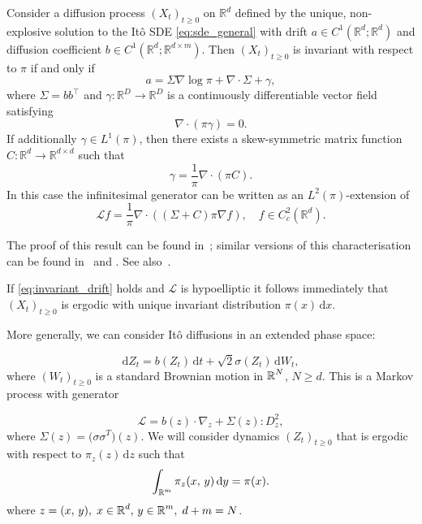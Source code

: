 \begin{theorem}
\label{theorem:invariance_theorem}
Consider a diffusion process $(X_t)_{t\ge0}$ on $\mathbb{R}^{d}$ defined by the unique, non-explosive solution to the It\^{o} SDE \eqref{eq:sde_general} with drift $a \in C^1(\mathbb{R}^{d}; \mathbb{R}^d)$ and  diffusion coefficient $b\in C^1(\mathbb{R}^d; \mathbb{R}^{d\times m})$.  Then $(X_t)_{t\ge0}$ is invariant with respect to ${\pi}$ if and only if  
\begin{equation}
\label{eq:invariant_drift}
a = \Sigma \nabla \log \pi + \nabla\cdot \Sigma + \gamma,
\end{equation} 
where $\Sigma = bb^\top$ and $\gamma: \mathbb{R}^D\rightarrow \mathbb{R}^D$  is a continuously differentiable vector field satisfying 
\begin{equation}
\label{eq:invariance_condition}
\nabla\cdot\left(\pi \gamma \right) = 0.
\end{equation}  
If additionally $\gamma \in L^1({\pi})$, then there exists a skew-symmetric matrix function $C:\mathbb{R}^d \rightarrow \mathbb{R}^{d\times d}$ such that
$$
  \gamma = \frac{1}{{\pi}} \nabla\cdot\left({\pi} C \right).
$$
In this case the infinitesimal generator can be written as an $L^2(\pi)$-extension of
$$
\mathcal{L}f = \frac{1}{{\pi}}\nabla\cdot\left((\Sigma + C){\pi}\nabla f\right),\quad f\in C^2_c(\mathbb{R}^d).
$$ 
\end{theorem}

The proof of this result can be found in~\cite[Ch. 4]{pavliotis2014stochastic}; similar versions of this characterisation can be found in~\cite{villani2009hypocoercivity} and \cite{Hwang2005}. See also~\cite{ma2015complete}.

\begin{remark}
If \eqref{eq:invariant_drift} holds and $\mathcal{L}$ is hypoelliptic it follows immediately that $(X_t)_{t\ge0}$ is ergodic with unique invariant distribution $\pi(x)\,\mathrm{d}x$.
\end{remark}

More generally, we can consider It\^{o} diffusions in an extended phase space:

\begin{equation}\label{e:SDE}
\mathrm{d} Z_{t} = b(Z_t) \, \mathrm{d}t + \sqrt{2}\sigma(Z_{t}) \, \mathrm{d}W_{t}, 
\end{equation}
where $(W_{t})_{t\ge0}$ is a standard Brownian motion in $\operatorname{\mathbb{R}}^{N}$, $N \geq d$. This is a Markov process with generator

\begin{equation}\label{e:gen}
\mathcal{L} = b(z) \cdot \nabla_z +  \Sigma(z) : D^2_z , 
\end{equation}
where $\Sigma(z) = \big( \sigma \sigma^{T} \big)(z)$. We will consider dynamics $(Z_t)_{t\ge0}$ that is ergodic with respect to $\pi_z(z) \, \mathrm{d}z$ such that 
\begin{equation}\label{e:marginal}
\int_{\operatorname{\mathbb{R}}^{m}} \pi_z (x, \, y) \, \mathrm{d}y = \pi(x).
\end{equation}
where $z = (x, \, y), \; x \in \operatorname{\mathbb{R}}^d, \, y \in \operatorname{\mathbb{R}}^m, \; d+m = N$.

